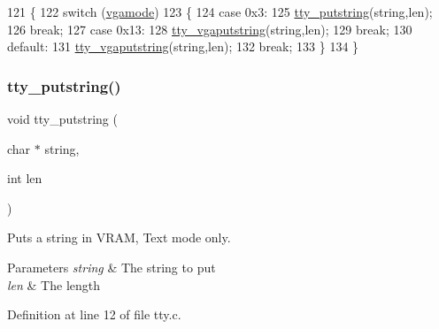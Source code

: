 \begin{DoxyCode}
121                                             \{
122     \textcolor{keywordflow}{switch} (\hyperlink{a00173_af93b0649fdd1bea5b6d29ed37205aa2c_af93b0649fdd1bea5b6d29ed37205aa2c}{vgamode})
123     \{
124     \textcolor{keywordflow}{case} 0x3:
125         \hyperlink{a00173_a5b5bf610a57f3c59b2851fa2652081ec_a5b5bf610a57f3c59b2851fa2652081ec}{tty\_putstring}(\textcolor{keywordtype}{string},len);
126         \textcolor{keywordflow}{break};
127     \textcolor{keywordflow}{case} 0x13:
128         \hyperlink{a00173_a05ca3f5e64f38fec173b635ca8465415_a05ca3f5e64f38fec173b635ca8465415}{tty\_vgaputstring}(\textcolor{keywordtype}{string},len);
129         \textcolor{keywordflow}{break};
130     \textcolor{keywordflow}{default}:
131         \hyperlink{a00173_a05ca3f5e64f38fec173b635ca8465415_a05ca3f5e64f38fec173b635ca8465415}{tty\_vgaputstring}(\textcolor{keywordtype}{string},len);
132         \textcolor{keywordflow}{break};
133     \}
134 \}
\end{DoxyCode}
\mbox{\label{a00176_a5b5bf610a57f3c59b2851fa2652081ec_a5b5bf610a57f3c59b2851fa2652081ec}} 
\subsubsection{\texorpdfstring{tty\+\_\+putstring()}{tty\_putstring()}}
{\footnotesize\ttfamily void tty\+\_\+putstring (\begin{DoxyParamCaption}\item[{char $\ast$}]{string,  }\item[{int}]{len }\end{DoxyParamCaption})}



Puts a string in V\+R\+AM, Text mode only. 


\begin{DoxyParams}{Parameters}
{\em string} & The string to put \\
\hline
{\em len} & The length \\
\hline
\end{DoxyParams}


Definition at line 12 of file tty.\+c.


